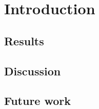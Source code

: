 \chapter{Introduction}

\section{Results}
\lipsum[1]

\section{Discussion}
\lipsum[1]

\section{Future work}
\lipsum[1]